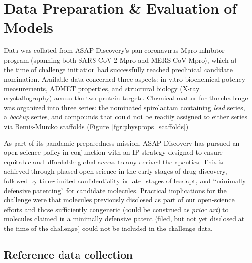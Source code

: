 \documentclass[journal=jcim,manuscript=article]{achemso}
\begin{document}
\section{Data Preparation \& Evaluation of Models}

Data was collated from ASAP Discovery’s pan-coronavirus Mpro inhibitor program (spanning both SARS-CoV-2 Mpro and MERS-CoV Mpro), which at the time of challenge initiation had successfully reached preclinical candidate nomination. Available data concerned three aspects: in-vitro biochemical potency measurements, ADMET properties, and structural biology (X-ray crystallography) across the two protein targets. Chemical matter for the challenge was organized into three series: the nominated spirolactam containing \textit{lead} series, a \textit{backup} series, and compounds that could not be readily assigned to either series via Bemis-Murcko scaffolds\cite{bemis_murcko_1996} (Figure~\ref{fgr:physprops_scaffolds}).

As part of its pandemic preparedness mission, ASAP Discovery has pursued an open-science policy in conjunction with an IP strategy designed to ensure equitable and affordable global access to any derived therapeutics. This is achieved through phased open science in the early stages of drug discovery, followed by time-limited confidentiality in later stages of leadopt, and “minimally defensive patenting” for candidate molecules\cite{griffen_2024}. Practical implications for the challenge were that molecules previously disclosed as part of our open-science efforts and those sufficiently congeneric (could be construed as \textit{prior art}\cite{ACS_patents}) to molecules claimed in a minimally defensive patent (filed, but not yet disclosed at the time of the challenge) could not be included in the challenge data.

\subsection{Reference data collection}
\end{document}
